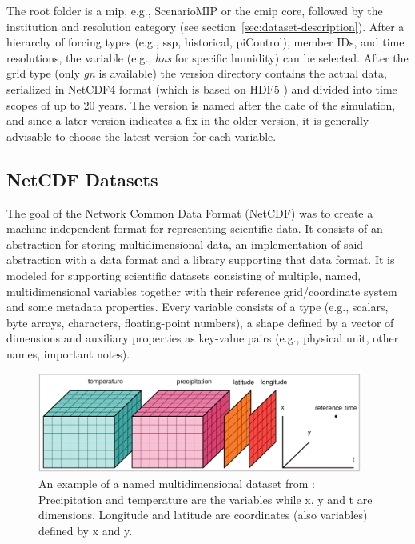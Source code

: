 The root folder is a \ac{mip}, e.g., ScenarioMIP or the \ac{cmip} core, followed by the institution and resolution category (see section~\ref{sec:dataset-description}). 
After a hierarchy of forcing types (e.g., \ac{ssp}, historical, piControl), member IDs, and time resolutions, the variable (e.g., \textit{hus} for specific humidity) can be selected. 
After the grid type (only \textit{gn} is available) the version directory contains the actual data, serialized in NetCDF4 format (which is based on HDF5 \cite{folk_overview_2011}) and divided into time scopes of up to 20 years. 
The version is named after the date of the simulation, and since a later version indicates a fix in the older version, it is generally advisable to choose the latest version for each variable.


\subsection{NetCDF Datasets}

The goal of the Network Common Data Format (NetCDF) was to create a machine independent format for representing scientific data. 
It consists of an abstraction for storing multidimensional data, an implementation of said abstraction with a data format and a library supporting that data format. 
It is modeled for supporting scientific datasets consisting of multiple, named, multidimensional variables together with their reference grid/coordinate system and some metadata properties.
Every variable consists of a type (e.g., scalars, byte arrays, characters, floating-point numbers), a shape defined by a vector of dimensions and auxiliary properties as key-value pairs (e.g., physical unit, other names, important notes). \cite{rew_netcdf_1990}

\begin{figure}[htb]
  \begin{center}
    \includegraphics[width=0.95\textwidth]{figures/netcdf_visual_example.png}
  \end{center}
  \caption{An example of a named multidimensional dataset from \cite{hoyer_xarray_2017}: Precipitation and temperature are the variables while x, y and t are dimensions. Longitude and latitude are coordinates (also variables) defined by x and y.}
  \label{fig:example_dataset_structure}
\end{figure}

